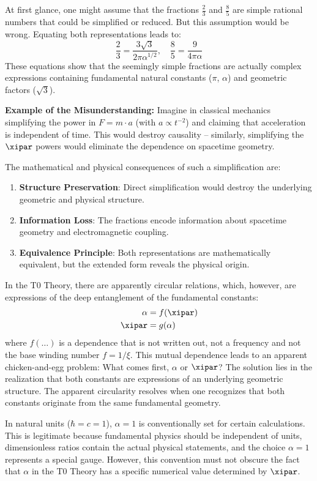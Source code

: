 	At first glance, one might assume that the fractions $\frac{2}{3}$ and $\frac{8}{5}$ are simple rational numbers that could be simplified or reduced. But this assumption would be wrong. Equating both representations leads to:
	\[
	\frac{2}{3} = \frac{3\sqrt{3}}{2\pi\alpha^{1/2}}, \quad \frac{8}{5} = \frac{9}{4\pi\alpha}
	\]
	These equations show that the seemingly simple fractions are actually complex expressions containing fundamental natural constants ($\pi$, $\alpha$) and geometric factors ($\sqrt{3}$).
	
	\textbf{Example of the Misunderstanding:} Imagine in classical mechanics simplifying the power in $F = m \cdot a$ (with $a \propto t^{-2}$) and claiming that acceleration is independent of time. This would destroy causality – similarly, simplifying the $\xipar$ powers would eliminate the dependence on spacetime geometry.
	
	The mathematical and physical consequences of such a simplification are:
	\begin{enumerate}
		\item \textbf{Structure Preservation}: Direct simplification would destroy the underlying geometric and physical structure.
		\item \textbf{Information Loss}: The fractions encode information about spacetime geometry and electromagnetic coupling.
		\item \textbf{Equivalence Principle}: Both representations are mathematically equivalent, but the extended form reveals the physical origin.
	\end{enumerate}
	
	In the T0 Theory, there are apparently circular relations, which, however, are expressions of the deep entanglement of the fundamental constants:
	\begin{align*}
		\alpha &= f(\xipar) \\
		\xipar &= g(\alpha)
	\end{align*}
	where $f(\ldots)$ is a dependence that is not written out, not a frequency and not the base winding number $f = 1/\xi$. This mutual dependence leads to an apparent chicken-and-egg problem: What comes first, $\alpha$ or $\xipar$? The solution lies in the realization that both constants are expressions of an underlying geometric structure. The apparent circularity resolves when one recognizes that both constants originate from the same fundamental geometry.

	In natural units ($\hbar = c = 1$), $\alpha = 1$ is conventionally set for certain calculations. This is legitimate because fundamental physics should be independent of units, dimensionless ratios contain the actual physical statements, and the choice $\alpha = 1$ represents a special gauge. However, this convention must not obscure the fact that $\alpha$ in the T0 Theory has a specific numerical value determined by $\xipar$.
	
